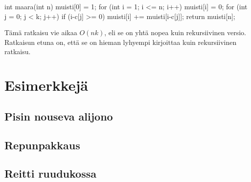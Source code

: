 \begin{code}
int maara(int n) {
    muisti[0] = 1;
    for (int i = 1; i <= n; i++) {
        muisti[i] = 0;
        for (int j = 0; j < k; j++) {
            if (i-c[j] >= 0) {
                muisti[i] += muisti[i-c[j]];
            }
        }
    }
    return muisti[n];
}
\end{code}

Tämä ratkaisu vie aikaa $O(nk)$, eli se on yhtä nopea kuin
rekursiivinen versio.
Ratkaisun etuna on, että se on hieman lyhyempi kirjoittaa
kuin rekursiivinen ratkaisu.

\section{Esimerkkejä}

\subsection{Pisin nouseva alijono}

\subsection{Repunpakkaus}

\subsection{Reitti ruudukossa}
